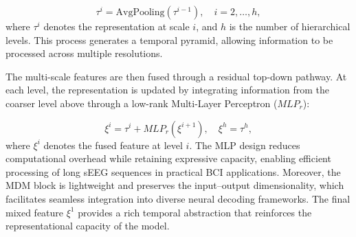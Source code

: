 \documentclass{article}
\begin{document}
\begin{equation}
\tau^{i} = \text{AvgPooling}(\tau^{i-1}), \quad i = 2, \ldots, h,
\end{equation}
where $\tau^i$ denotes the representation at scale $i$, and $h$ is the number of hierarchical levels. This process generates a temporal pyramid, allowing information to be processed across multiple resolutions.

The multi-scale features are then fused through a residual top-down pathway. At each level, the representation is updated by integrating information from the coarser level above through a low-rank Multi-Layer Perceptron ($MLP_r$):

\begin{equation}
\xi^{i} = \tau^{i} + MLP_{r}(\xi^{i+1}), \quad \xi^{h} = \tau^{h},
\end{equation}
where $\xi^i$ denotes the fused feature at level $i$. The MLP design reduces computational overhead while retaining expressive capacity, enabling efficient processing of long sEEG sequences in practical BCI applications. Moreover, the MDM block is lightweight and preserves the input–output dimensionality, which facilitates seamless integration into diverse neural decoding frameworks. The final mixed feature $\xi^1$ provides a rich temporal abstraction that reinforces the representational capacity of the model.

\end{document}
